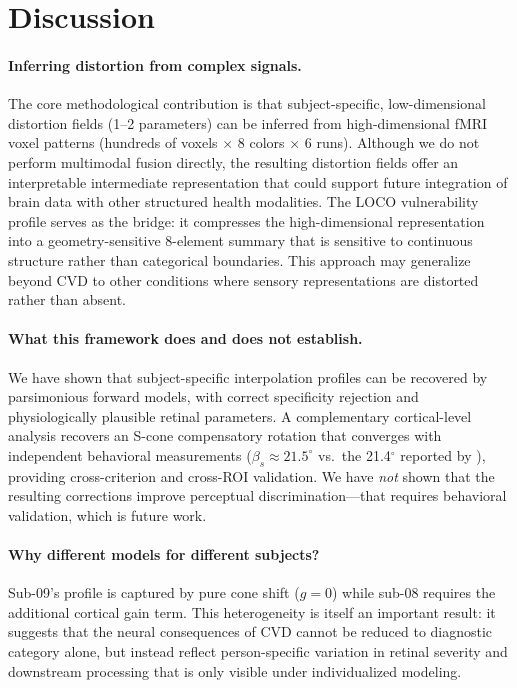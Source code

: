 \documentclass{article}
\begin{document}
\section{Discussion}
\label{sec:discussion}

\paragraph{Inferring distortion from complex signals.}
The core methodological contribution is that subject-specific, low-dimensional distortion fields (1--2 parameters) can be inferred from high-dimensional fMRI voxel patterns (hundreds of voxels $\times$ 8 colors $\times$ 6 runs). Although we do not perform multimodal fusion directly, the resulting distortion fields offer an interpretable intermediate representation that could support future integration of brain data with other structured health modalities.
The LOCO vulnerability profile serves as the bridge: it compresses the high-dimensional representation into a geometry-sensitive 8-element summary that is sensitive to continuous structure rather than categorical boundaries.
This approach may generalize beyond CVD to other conditions where sensory representations are distorted rather than absent.

\paragraph{What this framework does and does not establish.}
We have shown that subject-specific interpolation profiles can be recovered by parsimonious forward models, with correct specificity rejection and physiologically plausible retinal parameters.
A complementary cortical-level analysis recovers an S-cone compensatory rotation that converges with independent behavioral measurements ($\beta_s \approx 21.5^\circ$ vs.\ the 21.4$^\circ$ reported by \citealt{emery2021}), providing cross-criterion and cross-ROI validation.
We have \emph{not} shown that the resulting corrections improve perceptual discrimination---that requires behavioral validation, which is future work.

\paragraph{Why different models for different subjects?}
Sub-09's profile is captured by pure cone shift ($g = 0$) while sub-08 requires the additional cortical gain term.
This heterogeneity is itself an important result: it suggests that the neural consequences of CVD cannot be reduced to diagnostic category alone, but instead reflect person-specific variation in retinal severity and downstream processing that is only visible under individualized modeling.
\end{document}
